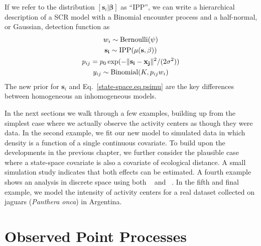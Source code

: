 If we refer to the distribution $[\mathbf{s}_i | \bm{\beta}]$ as
``IPP'', we can write a hierarchical description of a SCR model with a
Binomial encounter process and a half-normal, or Gaussian, detection function as
\begin{gather*}
w_i \sim \mbox{Bernoulli}(\psi) \\
{\bf s_i} \sim \mbox{IPP}(\mu(\mathbf{s},\beta)) \\
p_{ij} = p_0 \exp(-\|{\bf s_i} - {\bf x_{j}}\|^2/(2\sigma^2)) \\
y_{ij} \sim \mbox{Binomial}(K, p_{ij} w_i)
\end{gather*}
The new prior for $\mathbf{s}_i$ and Eq.~\ref{state-space.eq.psimu}
are the key differences between homogeneous an inhomogeneous
models.

In the next sections we walk through a few examples, building up from
the simplest case where we actually observe the activity centers as
though they were data. In the second example, we fit our new model to simulated
data in which density is a function of a single continuous
covariate. To build upon the developments in the previous chapter, we
further consider the plausible case where a state-space covariate is also a
covariate of ecological distance. A small simulation study indicates
that both effects can be estimated. A fourth example shows an analysis in discrete space using
both \secr~\citep{efford:2011} and \jags~\citep{plummer:2003}. In the
fifth and final example, we model the intensity of
activity centers for a real dataset collected on jaguars
(\emph{Panthera onca}) in Argentina.

\section{Observed Point Processes}

